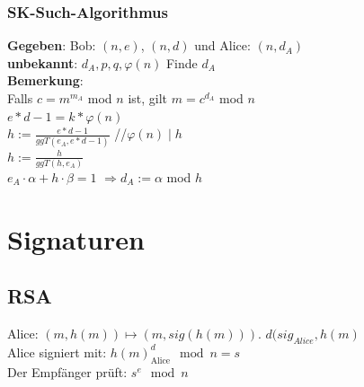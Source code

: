 \documentclass[landscape,twocolumn,a4paper]{article}
\newcommand{\Ra}{\Rightarrow}
\begin{document}
\subsubsection{SK-Such-Algorithmus}
{
\textbf{Gegeben}: Bob: $(n,e)$, $(n,d)$ und Alice: $(n,d_A)$ \\
\textbf{unbekannt}: $d_A,p,q,\varphi(n)$ Finde $d_A$ \\
\textbf{Bemerkung}: \\
    Falls $c=m^{m_A}$ mod $n$ ist, gilt $m=c^{d_A}$ mod $n$ \\
    $e*d-1=k*\varphi(n)$ \\
    $h:=\frac{e*d-1}{ggT(e_A,e*d-1)}$ \hspace*{2cm}//$\varphi(n)\mid h$\\
    $h:=\frac{h}{ggT(h,e_A)}$ \\
    $e_A\cdot\alpha+h\cdot\beta=1 $ {\color{red}$\Ra d_A:=\alpha$ mod $h$}
}
\section{Signaturen}
\subsection{RSA}
Alice: $(m, h(m)) \mapsto (m, sig(h(m)))$. $d(sig_{Alice}, h(m)$ \\ Alice signiert mit: $h(m)^d_{\text{Alice}} \mod n = s$ \\
Der Empfänger prüft: $s^e \mod n$
\end{document}
